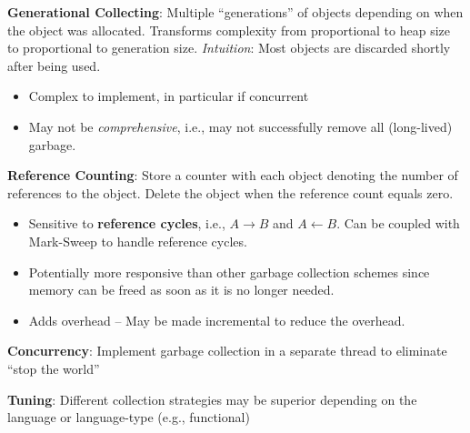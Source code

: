\documentclass[10pt,twocolumn]{report}
\begin{document}
\textbf{Generational Collecting}: Multiple ``generations'' of objects depending on when the object was allocated. Transforms complexity from proportional to heap size to proportional to generation size. \textit{Intuition}: Most objects are discarded shortly after being used.
\begin{itemize}
  \item Complex to implement, in particular if concurrent
  \item May not be \textit{comprehensive}, i.e., may not successfully remove all (long-lived) garbage.
\end{itemize}

\textbf{Reference Counting}: Store a counter with each object denoting the number of references to the object.  Delete the object when the reference count equals zero.
\begin{itemize}
  \item Sensitive to \textbf{reference cycles}, i.e., $A \rightarrow B$ and $A \leftarrow B$.  Can be coupled with Mark-Sweep to handle reference cycles.
  \item Potentially more responsive than other garbage collection schemes since memory can be freed as soon as it is no longer needed.
  \item Adds overhead -- May be made incremental to reduce the overhead.
\end{itemize}

\textbf{Concurrency}: Implement garbage collection in a separate thread to eliminate ``stop the world''

\textbf{Tuning}: Different collection strategies may be superior depending on the language or language-type (e.g., functional)
\end{document}
